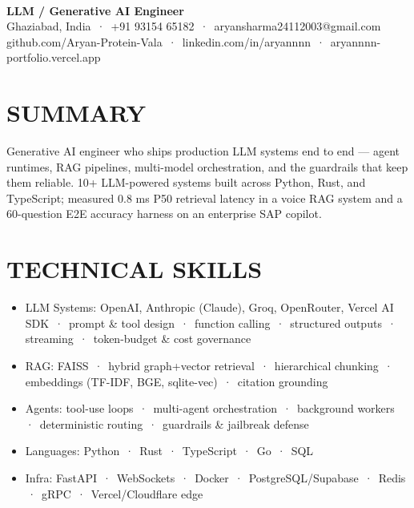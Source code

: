 \documentclass[9pt]{article}
\begin{document}
\\[3pt]
{\large\bfseries LLM / Generative AI Engineer}\\[3pt]
{\small\color{greyc} Ghaziabad, India \,·\, +91 93154 65182 \,·\, aryansharma24112003@gmail.com}\vspace{-2pt}
{\small\color{greyc} github.com/Aryan-Protein-Vala \,·\, linkedin.com/in/aryannnn \,·\, aryannnn-portfolio.vercel.app}\vspace{-2pt}
\section*{SUMMARY}
Generative AI engineer who ships production LLM systems end to end  ---  agent runtimes, RAG pipelines, multi-model orchestration, and the guardrails that keep them reliable. 10+ LLM-powered systems built across Python, Rust, and TypeScript; measured 0.8 ms P50 retrieval latency in a voice RAG system and a 60-question E2E accuracy harness on an enterprise SAP copilot.
\vspace{1pt}
\section*{TECHNICAL SKILLS}
\begin{itemize}[leftmargin=11pt,itemsep=0pt,topsep=1pt,parsep=0pt]
\item LLM Systems: OpenAI, Anthropic (Claude), Groq, OpenRouter, Vercel AI SDK \,·\, prompt \& tool design \,·\, function calling \,·\, structured outputs \,·\, streaming \,·\, token-budget \& cost governance
\item RAG: FAISS \,·\, hybrid graph+vector retrieval \,·\, hierarchical chunking \,·\, embeddings (TF-IDF, BGE, sqlite-vec) \,·\, citation grounding
\item Agents: tool-use loops \,·\, multi-agent orchestration \,·\, background workers \,·\, deterministic routing \,·\, guardrails \& jailbreak defense
\item Languages: Python \,·\, Rust \,·\, TypeScript \,·\, Go \,·\, SQL
\item Infra: FastAPI \,·\, WebSockets \,·\, Docker \,·\, PostgreSQL/Supabase \,·\, Redis \,·\, gRPC \,·\, Vercel/Cloudflare edge
\end{itemize}
\end{document}
